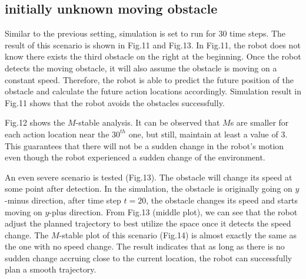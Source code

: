 \documentclass{ifacconf}
\begin{document}
\subsection{initially unknown moving obstacle}

Similar to the previous setting, simulation is set to run for 30 time steps. The result of this scenario is shown in Fig.11 and Fig.13. In Fig.11, the robot does not know there exists the third obstacle on the right at the beginning. Once the robot detects the moving obstacle, it will also assume the obstacle is moving on a constant speed. Therefore, the robot is able to predict the future position of the obstacle and calculate the future action locations accordingly. Simulation result in Fig.11 shows that the robot avoids the obstacles successfully.

Fig.12 shows the $M$-stable analysis. It can be observed that $M$s are smaller for each action location near the $30^{th}$ one, but still, maintain at least a value of 3. This guarantees that there will not be a sudden change in the robot's motion even though the robot experienced a sudden change of the environment.

An even severe scenario is tested (Fig.13). The obstacle will change its speed at some point after detection. In the simulation, the obstacle is originally going on $y$-minus direction, after time step $t=20$, the obstacle changes its speed and starts moving on $y$-plus direction. From Fig.13 (middle plot), we can see that the robot adjust the planned trajectory to best utilize the space once it detects the speed change. The $M$-stable plot of this scenario (Fig.14) is almost exactly the same as the one with no speed change. The result indicates that as long as there is no sudden change accruing close to the current location, the robot can successfully plan a smooth trajectory.
\end{document}
